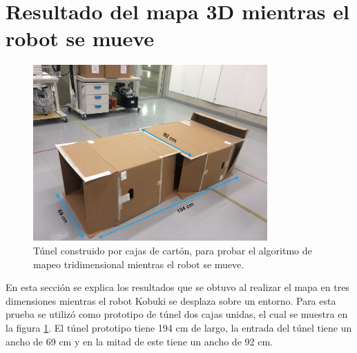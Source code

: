 \section{Resultado del mapa 3D mientras el robot se mueve}
\begin{figure}
  \centering \footnotesize
  \includegraphics[width=0.80\textwidth]{images/prueba_cajas.JPG}
  \captionsetup{font=footnotesize}
  \caption{Túnel construido por cajas de cartón, para probar el algoritmo
  de mapeo tridimensional mientras el robot se mueve.}
  \label{fig:tunel201}
\end{figure}
En esta sección se explica los resultados que se obtuvo al realizar el mapa en tres
dimensiones mientras el robot Kobuki se desplaza sobre un entorno. Para esta prueba se utilizó 
como prototipo de túnel dos cajas unidas, el cual se muestra en la figura \ref{fig:tunel201}. 
El túnel prototipo tiene 194 cm de largo, la entrada del túnel tiene un ancho de 69 cm y en la 
mitad de este tiene un ancho de 92 cm.

